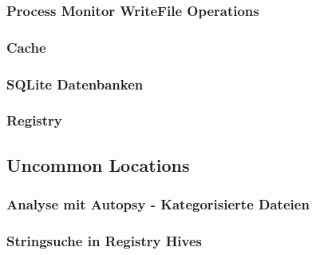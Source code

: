 \begin{appendices}
\subsubsection*{Process Monitor WriteFile Operations}
\label{subsubsection:appendix-brave-common-locations-writefile-operations}

\subsubsection*{Cache}

\subsubsection*{SQLite Datenbanken}

\subsubsection*{Registry}

\subsection*{Uncommon Locations}

\subsubsection*{Analyse mit Autopsy - Kategorisierte Dateien}

\subsubsection*{Stringsuche in Registry Hives}

\end{appendices}